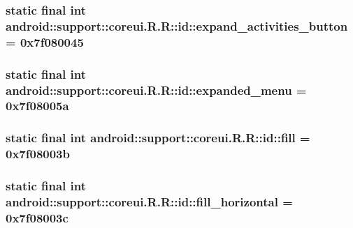 \hypertarget{classandroid_1_1support_1_1coreui_1_1_r_1_1id_32ee58cf1c5e941cbbf3821cb56debef}{
\subsubsection[{expand\_\-activities\_\-button}]{\setlength{\rightskip}{0pt plus 5cm}static final int android::support::coreui.R.R::id::expand\_\-activities\_\-button = 0x7f080045}}
\label{classandroid_1_1support_1_1coreui_1_1_r_1_1id_32ee58cf1c5e941cbbf3821cb56debef}


\hypertarget{classandroid_1_1support_1_1coreui_1_1_r_1_1id_a3cde89f481fca3e54a437e13b4cbf7f}{
\subsubsection[{expanded\_\-menu}]{\setlength{\rightskip}{0pt plus 5cm}static final int android::support::coreui.R.R::id::expanded\_\-menu = 0x7f08005a}}
\label{classandroid_1_1support_1_1coreui_1_1_r_1_1id_a3cde89f481fca3e54a437e13b4cbf7f}


\hypertarget{classandroid_1_1support_1_1coreui_1_1_r_1_1id_bc2c8d28eb4a94af4f5e0f873125f4e2}{
\subsubsection[{fill}]{\setlength{\rightskip}{0pt plus 5cm}static final int android::support::coreui.R.R::id::fill = 0x7f08003b}}
\label{classandroid_1_1support_1_1coreui_1_1_r_1_1id_bc2c8d28eb4a94af4f5e0f873125f4e2}


\hypertarget{classandroid_1_1support_1_1coreui_1_1_r_1_1id_dd7d46119e036b350d15f6a111dd5c6d}{
\subsubsection[{fill\_\-horizontal}]{\setlength{\rightskip}{0pt plus 5cm}static final int android::support::coreui.R.R::id::fill\_\-horizontal = 0x7f08003c}}
\label{classandroid_1_1support_1_1coreui_1_1_r_1_1id_dd7d46119e036b350d15f6a111dd5c6d}


